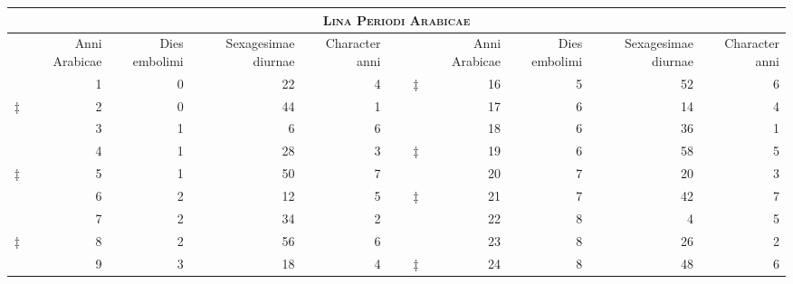 %
\begin{tabnums} %
\normalsize
\centering
\setlength{\tabcolsep}{1.0ex}
%
\newcommand{\cwd}{3.2em}
\newcommand{\da}{{\scriptsize †}}
\newcommand{\db}{{\scriptsize ‡}}
\newcommand{\ang}{90}
\newcommand{\hsa}[1]{\footnotesize{#1}}
\newcommand{\hsb}[1]{\tiny{#1}}
\newcommand{\hdrB}{%
  ~ &
  \hsb{\parbox[b]{\cwd}{\raggedright Anni Arabicae}} &
  \hsb{\parbox[b]{\cwd}{\raggedright Dies embolimi}} &
  \hsb{\parbox[b]{\cwd}{\raggedright Sexa\-ge\-si\-mae diurnae}} &
  \hsb{\parbox[b]{\cwd}{\raggedright Cha\-rac\-ter anni}}
}
%
\newcommand{\hdrs}{%
 \hdrB & & \hdrB \\
 \cmidrule(l){1-5} \cmidrule(l){7-11}
}
%
\begin{tabular}[c]{@{} r rrrr c r rrrr @{}}
\toprule
\multicolumn{11}{c}{\Large\textsc{Lina Periodi Arabicae}} \\
\toprule
\hdrs %
    &  1 & 0 & 22 & 4  &~& \db & 16 &  5 & 52 & 6\\
\db &  2 & 0 & 44 & 1  &~&     & 17 &  6 & 14 & 4\\
    &  3 & 1 &  6 & 6  &~&     & 18 &  6 & 36 & 1\\
    &  4 & 1 & 28 & 3  &~& \db & 19 &  6 & 58 & 5\\
\db &  5 & 1 & 50 & 7  &~&     & 20 &  7 & 20 & 3\\
    &  6 & 2 & 12 & 5  &~& \db & 21 &  7 & 42 & 7\\
    &  7 & 2 & 34 & 2  &~&     & 22 &  8 &  4 & 5\\
\db &  8 & 2 & 56 & 6  &~&     & 23 &  8 & 26 & 2\\
    &  9 & 3 & 18 & 4  &~& \db & 24 &  8 & 48 & 6\\

\end{tabular}
\end{tabnums}
